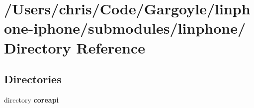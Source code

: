 \section{/\-Users/chris/\-Code/\-Gargoyle/linphone-\/iphone/submodules/linphone/ \-Directory \-Reference}
\label{dir_5881eeab4ff0ce6b918a3b242622dee4}
\subsection*{\-Directories}
\begin{DoxyCompactItemize}
\item 
directory {\bf coreapi}
\end{DoxyCompactItemize}
